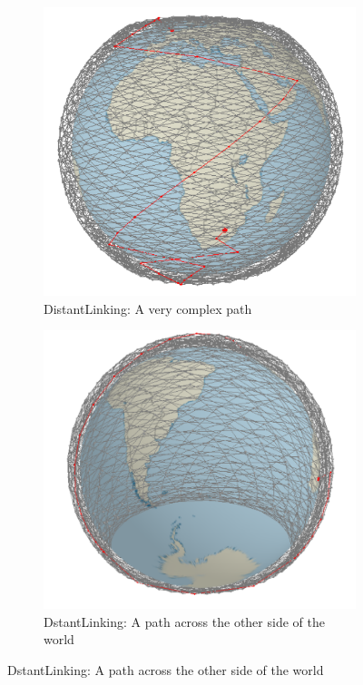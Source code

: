 \documentclass[12pt]{report}
\begin{document}
\begin{figure}
	\begin{subfigure}[b]{0.4\textwidth}
		\caption{DistantLinking: A very complex path}
		\includegraphics[width=\textwidth]{LDN-JHB-DistL-1}
	\end{subfigure}
	\hfill
	\begin{subfigure}[b]{0.4\textwidth}
		\caption{DstantLinking: A path across the other side of the world}
		\includegraphics[width=\textwidth]{LDN-JHB-DistL-2}
	\end{subfigure}
\end{figure}
\end{document}
